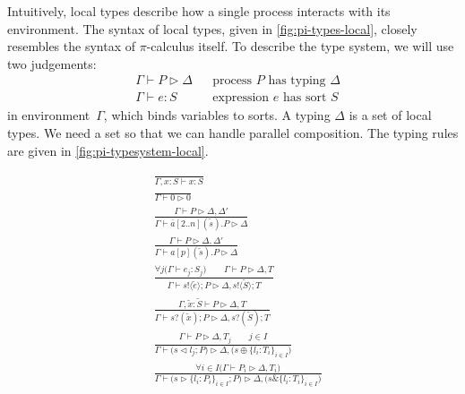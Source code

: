 \documentclass[a4paper,12pt,oneside,fleqn]{book} %
\begin{document}
Intuitively,
  local types describe how a single process interacts with its environment.
The syntax of local types,
  given in \autoref{fig:pi-types-local},
  closely resembles the syntax of $\pi$-calculus itself.
To describe the type system,
  we will use two judgements:
\begin{align}
  &\Gamma \vdash P \triangleright \Delta
    &&\text{process $P$ has typing $\Delta$}
\\
  &\Gamma \vdash e : S
    &&\text{expression $e$ has sort $S$}
\end{align}
in environment~$\Gamma$,
  which binds variables to sorts.
A typing $\Delta$ is a set of local types.
We need a set so that we can handle parallel composition.
The typing rules are given in \autoref{fig:pi-typesystem-local}.

\begin{figure}
\begin{center}
\begin{align}
&\frac
  {}
  {\Gamma, x:S \vdash x : S}
\\[1ex]
&\frac
  {}
  {\Gamma \vdash 0 \triangleright 0}
  \label{eq:pi-typesystem-inact}
\\[1ex]
&\frac
  {\Gamma \vdash P \triangleright \Delta, \Delta'}
  {\Gamma \vdash \bar{a}[2..n](\tilde{s}).P \triangleright \Delta}
  \label{eq:pi-mcast}
\\[1ex]
&\frac
  {\Gamma \vdash P \triangleright \Delta, \Delta'}
  {\Gamma \vdash a[p](\tilde{s}).P \triangleright \Delta}
  \label{eq:pi-macc}
\\[1ex]
&\frac
  {\forall j \bigl(\Gamma \vdash e_j : S_j\bigr)
    \qquad \Gamma \vdash P \triangleright \Delta,T}
  {\Gamma \vdash s!\langle\tilde{e}\rangle;P
    \triangleright \Delta, s!\langle\tilde{S}\rangle;T}
  \label{eq:pi-typesystem-send}
\\[1ex]
&\frac
  {\Gamma, \tilde{x}:\tilde{S} \vdash P \triangleright \Delta,T}
  {\Gamma \vdash s?(\tilde{x});P
    \triangleright \Delta, s?(\tilde{S});T}
  \label{eq:pi-typesystem-rcv}
\\[1ex]
&\frac
  {\Gamma \vdash P \triangleright \Delta,T_j
    \qquad j\in I}
  {\Gamma \vdash \bigl(s \triangleleft l_j; P\bigr)
    \triangleright
    \Delta,\bigl(s\oplus\{l_i:T_i\}_{i\in I}\bigr) }
  \label{eq:pi-typesystem-select}
\\[1ex]
&\frac
  {\forall i\in I \bigl(\Gamma \vdash P_i \triangleright \Delta,T_i\bigr)}
  {\Gamma \vdash \bigl(s \triangleright \{l_i:P_i\}_{i\in I}; P\bigr)
    \triangleright
    \Delta,\bigl(s\&\{l_i:T_i\}_{i\in I}\bigr) }

\end{align}
\end{center}
\end{figure}
\end{document}
